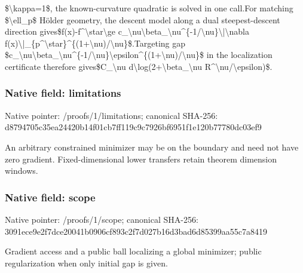 \documentclass[10pt,a4paper]{article}
\begin{document}
\$\textbackslash{}kappa=\allowbreak{}1\$,\allowbreak{} the known-curvature quadratic is solved in one call.\newline{}\newline{}For matching \$\textbackslash{}ell\_\allowbreak{}p\$ H{\AtlasUnicodeText ö}\allowbreak{}lder geometry,\allowbreak{} the descent model along a dual steepest-descent direction gives\newline{}\$f(x)-f\textasciicircum{}\textbackslash{}star\textbackslash{}ge c\_\allowbreak{}\textbackslash{}nu\textbackslash{}beta\_\allowbreak{}\textbackslash{}nu\textasciicircum{}\{-1/\allowbreak{}\textbackslash{}nu\}\textbackslash{}|\textbackslash{}nabla f(x)\textbackslash{}|\_\allowbreak{}\{p\textasciicircum{}\textbackslash{}star\}\textasciicircum{}\{(1+\textbackslash{}nu)/\allowbreak{}\textbackslash{}nu\}\$.\newline{}Targeting gap \$c\_\allowbreak{}\textbackslash{}nu\textbackslash{}beta\_\allowbreak{}\textbackslash{}nu\textasciicircum{}\{-1/\allowbreak{}\textbackslash{}nu\}\textbackslash{}epsilon\textasciicircum{}\{(1+\textbackslash{}nu)/\allowbreak{}\textbackslash{}nu\}\$ in the localization certificate therefore gives\newline{}\$C\_\allowbreak{}\textbackslash{}nu d\textbackslash{}log(2+\textbackslash{}beta\_\allowbreak{}\textbackslash{}nu R\textasciicircum{}\textbackslash{}nu/\allowbreak{}\textbackslash{}epsilon)\$.\par\endgroup

\subsubsection{Native field: limitations}
Native pointer: /proofs/1/limitations; canonical SHA-256: d8794705c35ea24420b14f01cb7ff119c9c7926bf6951f1e120b77780dc03ef9

\begingroup\raggedright\sloppy An arbitrary constrained minimizer may be on the boundary and need not have zero gradient. Fixed-dimensional lower transfers retain theorem dimension windows.\par\endgroup

\subsubsection{Native field: scope}
Native pointer: /proofs/1/scope; canonical SHA-256: 3091ece9e2f7dce20041b0906cf893c2f7d027b16d3bad6d85399aa55c7a8419

\begingroup\raggedright\sloppy Gradient access and a public ball localizing a global minimizer;\allowbreak{} public regularization when only initial gap is given.\par\endgroup
\end{document}
